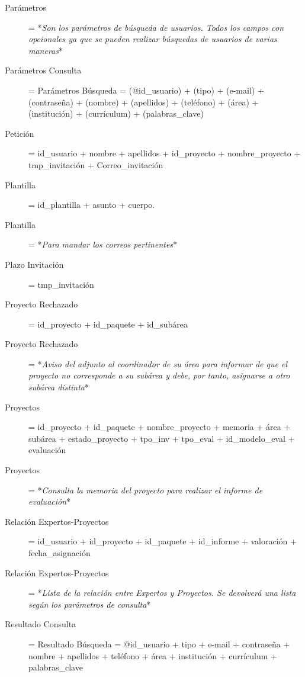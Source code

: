 \documentclass[12pt,a4paper,titlepage,spanish,twoside]{book}
\begin{document}
\begin{description}
\item[Parámetros] = *\emph{Son los parámetros de búsqueda de usuarios. Todos
    los campos con opcionales ya que se pueden realizar búsquedas de usuarios
    de varias maneras}* 

\item[Parámetros Consulta] = Parámetros Búsqueda = (@id\_usuario) + (tipo) +
  (e-mail) + (contraseña) + (nombre) + (apellidos) + (teléfono) + (área) +
  (institución) + (currículum) + (palabras\_clave) 

\item[Petición] = id\_usuario + nombre + apellidos + id\_proyecto +
  nombre\_proyecto + tmp\_invitación + Correo\_invitación 

\item[Plantilla] = id\_plantilla + asunto + cuerpo.

\item[Plantilla] = *\emph{Para mandar los correos pertinentes}*

\item[Plazo Invitación] = tmp\_invitación

\item[Proyecto Rechazado] = id\_proyecto + id\_paquete + id\_subárea

\item[Proyecto Rechazado] = *\emph{Aviso del adjunto al coordinador de su
    área para informar de que el proyecto no corresponde a su subárea y debe,
    por tanto, asignarse a otro subárea distinta}* 

\item[Proyectos] = id\_proyecto + id\_paquete + nombre\_proyecto + memoria +
  área + subárea + estado\_proyecto + tpo\_inv + tpo\_eval + id\_modelo\_eval
  + evaluación 

\item[Proyectos] = *\emph{Consulta la memoria del proyecto para realizar el
    informe de evaluación}* 

\item[Relación Expertos-Proyectos] = {id\_usuario + id\_proyecto +
    id\_paquete + id\_informe + valoración + fecha\_asignación} 

\item[Relación Expertos-Proyectos] = *\emph{Lista de la relación entre
    Expertos y Proyectos. Se devolverá una lista según los parámetros de
    consulta}* 

\item[Resultado Consulta] = Resultado Búsqueda = {@id\_usuario + tipo +
    e-mail + contraseña + nombre + apellidos + teléfono + área + institución
    + currículum + {palabras\_clave}} 


\end{description}
\end{document}
